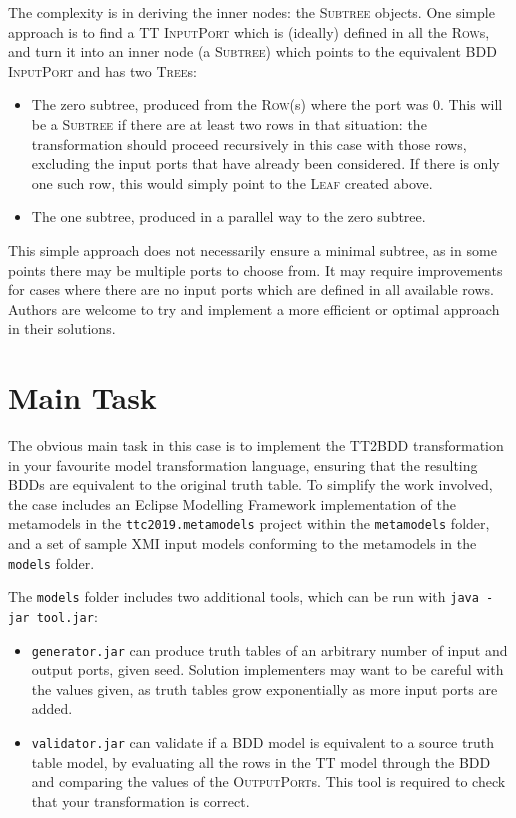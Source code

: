 \documentclass[a4paper]{scrartcl}
\newcommand*{\class}[1]{\textsc{#1}}
\newcommand*{\file}[1]{\texttt{#1}}
\begin{document}
The complexity is in deriving the inner nodes: the \class{Subtree} objects. One
simple approach is to find a TT \class{Input\-Port} which is (ideally) defined
in all the \class{Row}s, and turn it into an inner node (a \class{Subtree})
which points to the equivalent BDD \class{Input\-Port} and has two
\class{Tree}s:
\begin{itemize}
\item The zero subtree, produced from the \class{Row}(s) where the port was 0.
  This will be a \class{Subtree} if there are at least two rows in that
  situation: the transformation should proceed recursively in this case with
  those rows, excluding the input ports that have already been considered. If
  there is only one such row, this would simply point to the \class{Leaf}
  created above.

\item The one subtree, produced in a parallel way to the zero subtree.
\end{itemize}

This simple approach does not necessarily ensure a minimal subtree, as in some
points there may be multiple ports to choose from. It may require improvements
for cases where there are no input ports which are defined in all available
rows. Authors are welcome to try and implement a more efficient or optimal
approach in their solutions.

\section{Main Task}
\label{sec:task-suggestions}

The obvious main task in this case is to implement the TT2BDD transformation in
your favourite model transformation language, ensuring that the resulting BDDs
are equivalent to the original truth table. To simplify the work involved, the
case includes an Eclipse Modelling Framework implementation of the metamodels in
the \file{ttc2019.metamodels} project within the \file{metamodels} folder, and a
set of sample XMI input models conforming to the metamodels in the \file{models}
folder.

The \file{models} folder includes two additional tools, which can be run with
\file{java -jar tool.jar}:
\begin{itemize}
\item \file{generator.jar} can produce truth tables of an arbitrary number of
  input and output ports, given seed. Solution implementers may want to be
  careful with the values given, as truth tables grow exponentially as more
  input ports are added.

\item \file{validator.jar} can validate if a BDD model is equivalent to a source
  truth table model, by evaluating all the rows in the TT model through the BDD
  and comparing the values of the \class{Output\-Port}s. This tool is required
  to check that your transformation is correct.
\end{itemize}
\end{document}
